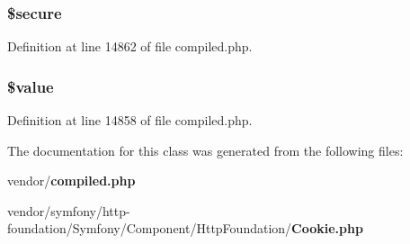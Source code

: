 \subsubsection[{\$secure}]{\setlength{\rightskip}{0pt plus 5cm}\$secure\hspace{0.3cm}{\ttfamily [protected]}}\label{class_symfony_1_1_component_1_1_http_foundation_1_1_cookie_af927c35431aa1720f5eb2ca677245143}


Definition at line 14862 of file compiled.\+php.

\subsubsection[{\$value}]{\setlength{\rightskip}{0pt plus 5cm}\$value\hspace{0.3cm}{\ttfamily [protected]}}\label{class_symfony_1_1_component_1_1_http_foundation_1_1_cookie_a0f298096f322952a72a50f98a74c7b60}


Definition at line 14858 of file compiled.\+php.



The documentation for this class was generated from the following files\+:\begin{DoxyCompactItemize}
\item 
vendor/{\bf compiled.\+php}\item 
vendor/symfony/http-\/foundation/\+Symfony/\+Component/\+Http\+Foundation/{\bf Cookie.\+php}\end{DoxyCompactItemize}
